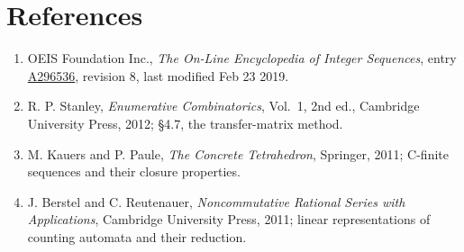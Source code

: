\documentclass[11pt]{article}
\theoremstyle{definition}
\begin{document}
\section{References}

\begin{enumerate}

\item OEIS Foundation Inc., \emph{The On-Line Encyclopedia of Integer Sequences}, entry \href{https://oeis.org/A296536}{A296536}, revision 8, last modified Feb 23 2019.

\item R. P. Stanley, \emph{Enumerative Combinatorics}, Vol.~1, 2nd ed., Cambridge University Press, 2012; \S4.7, the transfer-matrix method.

\item M. Kauers and P. Paule, \emph{The Concrete Tetrahedron}, Springer, 2011; C-finite sequences and their closure properties.

\item J. Berstel and C. Reutenauer, \emph{Noncommutative Rational Series with Applications}, Cambridge University Press, 2011; linear representations of counting automata and their reduction.

\end{enumerate}
\end{document}
